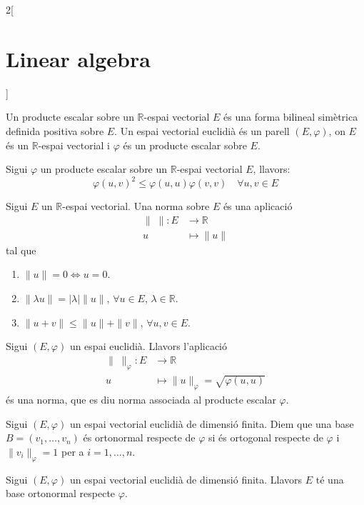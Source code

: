 \documentclass[../../../main.tex]{subfiles}
\begin{document}
\begin{multicols}{2}[\section{Linear algebra}]
\begin{definition}
Un producte escalar sobre un $\mathbb{R}$-espai vectorial $E$ és una forma bilineal simètrica definida positiva sobre $E$. Un espai vectorial euclidià és un parell $(E,\varphi)$, on $E$ és un $\mathbb{R}$-espai vectorial i $\varphi$ és un producte escalar sobre $E$.\label{espai_euclidia}
\end{definition}
\begin{theorem}
Sigui $\varphi$ un producte escalar sobre un $\mathbb{R}$-espai vectorial $E$, llavors: $$\varphi(u,v)^2\leq \varphi(u,u)\varphi(v,v)\quad\forall u,v\in E$$
\end{theorem}
\begin{definition}
Sigui $E$ un $\mathbb{R}$-espai vectorial. Una norma sobre $E$ és una aplicació \begin{align*}
    \|\;\|:E&\rightarrow\mathbb{R}\\
    u&\mapsto\|u\|
\end{align*}
tal que \begin{enumerate}
    \item $\|u\|=0\iff u=0$.
    \item $\|\lambda u\|=|\lambda|\|u\|$, $\forall u\in E$, $\lambda\in\mathbb{R}$.
    \item $\|u+v\|\leq\|u\|+\|v\|$, $\forall u,v\in E$.
\end{enumerate}
\end{definition}
\begin{prop}
Sigui $(E,\varphi)$ un espai euclidià. Llavors l'aplicació
\begin{align*}
    \|\;\|_\varphi:E&\rightarrow\mathbb{R}\\
    u&\mapsto\|u\|_\varphi=\sqrt{\varphi(u,u)}
\end{align*}
és una norma, que es diu norma associada al producte escalar $\varphi$.
\end{prop}
\begin{definition}
Sigui $(E,\varphi)$ un espai vectorial euclidià de dimensió finita. Diem que una base $B=(v_1,\ldots,v_n)$ és ortonormal respecte de $\varphi$ si és ortogonal respecte de $\varphi$ i $\|v_i\|_\varphi=1$ per a $i=1,\ldots,n$.
\end{definition}
\begin{corollary}
Sigui $(E,\varphi)$ un espai vectorial euclidià de dimensió finita. Llavors $E$ té una base ortonormal respecte $\varphi$.
\end{corollary}
\begin{definition}

\end{definition}
\end{multicols}
\end{document}
